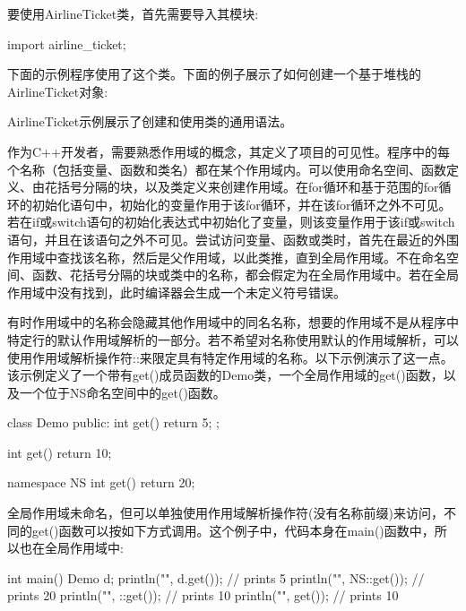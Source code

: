 
要使用AirlineTicket类，首先需要导入其模块:

\begin{cpp}
import airline_ticket;
\end{cpp}

下面的示例程序使用了这个类。下面的例子展示了如何创建一个基于堆栈的AirlineTicket对象:


AirlineTicket示例展示了创建和使用类的通用语法。


作为C++开发者，需要熟悉作用域的概念，其定义了项目的可见性。程序中的每个名称（包括变量、函数和类名）都在某个作用域内。可以使用命名空间、函数定义、由花括号分隔的块，以及类定义来创建作用域。在for循环和基于范围的for循环的初始化语句中，初始化的变量作用于该for循环，并在该for循环之外不可见。若在if或switch语句的初始化表达式中初始化了变量，则该变量作用于该if或switch语句，并且在该语句之外不可见。尝试访问变量、函数或类时，首先在最近的外围作用域中查找该名称，然后是父作用域，以此类推，直到全局作用域。不在命名空间、函数、花括号分隔的块或类中的名称，都会假定为在全局作用域中。若在全局作用域中没有找到，此时编译器会生成一个未定义符号错误。

有时作用域中的名称会隐藏其他作用域中的同名名称，想要的作用域不是从程序中特定行的默认作用域解析的一部分。若不希望对名称使用默认的作用域解析，可以使用作用域解析操作符::来限定具有特定作用域的名称。以下示例演示了这一点。该示例定义了一个带有get()成员函数的Demo类，一个全局作用域的get()函数，以及一个位于NS命名空间中的get()函数。

\begin{cpp}
class Demo
{
    public:
    int get() { return 5; }
};

int get() { return 10; }

namespace NS
{
    int get() { return 20; }
}
\end{cpp}

全局作用域未命名，但可以单独使用作用域解析操作符(没有名称前缀)来访问，不同的get()函数可以按如下方式调用。这个例子中，代码本身在main()函数中，所以也在全局作用域中:

\begin{cpp}
int main()
{
    Demo d;
    println("{}", d.get()); // prints 5
    println("{}", NS::get()); // prints 20
    println("{}", ::get()); // prints 10
    println("{}", get()); // prints 10
}
\end{cpp}

